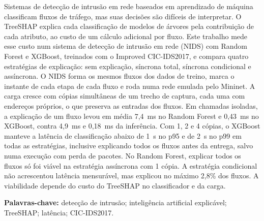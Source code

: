 \documentclass[
  12pt,
  oneside,
  a4paper,
  chapter=TITLE,
  sumario=tradicional,
  english,
  brazil
]{abntex2}
\begin{document}
\begin{resumo}
  Sistemas de detecção de intrusão em rede baseados em aprendizado de máquina classificam fluxos de
  tráfego, mas suas decisões são difíceis de interpretar. O TreeSHAP explica cada classificação de
  modelos de árvores pela contribuição de cada atributo, ao custo de um cálculo adicional por fluxo.
  Este trabalho mede esse custo num sistema de detecção de intrusão em rede (NIDS) com Random Forest e
  XGBoost, treinados com o Improved CIC-IDS2017, e compara quatro estratégias de explicação: sem
  explicação, síncrona total, síncrona condicional e assíncrona. O NIDS forma os mesmos fluxos dos
  dados de treino, marca o instante de cada etapa de cada fluxo e roda numa rede emulada pelo Mininet.
  A carga cresce com cópias simultâneas de um trecho de captura, cada uma com endereços próprios, o que
  preserva as entradas dos fluxos. Em chamadas isoladas, a explicação de um fluxo
  levou em média 7,4~ms no Random Forest e 0,43~ms no XGBoost, contra 4,9~ms e 0,18~ms da inferência.
  Com 1, 2 e 4 cópias, o XGBoost manteve a latência de classificação abaixo
  de 1~s no p95 e de 2~s no p99 em todas as estratégias, inclusive explicando todos os fluxos antes da
  entrega, salvo numa execução com perda de pacotes. No Random Forest, explicar todos os fluxos só foi
  viável na estratégia assíncrona com 1 cópia. A estratégia condicional não acrescentou latência
  mensurável, mas explicou no máximo 2,8\% dos fluxos. A viabilidade depende do custo do TreeSHAP no
  classificador e da carga.

  \vspace{\onelineskip}
  \noindent\textbf{Palavras-chave:} detecção de intrusão; inteligência artificial explicável;
  TreeSHAP; latência; CIC-IDS2017.
\end{resumo}
\end{document}
